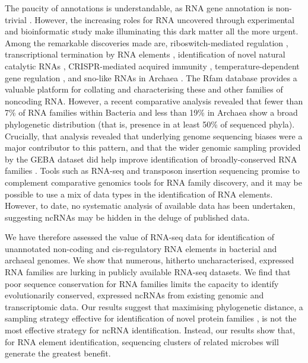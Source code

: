 \documentclass[10pt]{article}
\begin{document}
The paucity of annotations is understandable, as RNA gene annotation
is non-trivial \cite{Freyhult:2007,Nawrocki:2009}. However, the
increasing roles for RNA uncovered through experimental and
bioinformatic study make illuminating this dark matter all the more
urgent. Among the remarkable discoveries made are, riboswitch-mediated
regulation \cite{Barrick:2007}, transcriptional termination by RNA
elements \cite{Gardner:2011,Chen:2013,Cambray:2013}, identification of
novel natural catalytic RNAs \cite{Roth:2014}, CRISPR-mediated
acquired immunity \cite{Barrangou:2007}, temperature-dependent gene
regulation \cite{Loh:2013}, and sno-like RNAs in Archaea
\cite{Omer:2000,Gardner:2010}. The Rfam database
\cite{Gardner:2011,Burge:2013} provides a valuable platform for
collating and characterising these and other families of noncoding
RNA. However, a recent comparative analysis \cite{Hoeppner:2012}
revealed that fewer than 7\% of RNA families within Bacteria and less
than 19\% in Archaea show a broad phylogenetic distribution (that is,
presence in at least 50\% of sequenced phyla). Crucially, that
analysis revealed that underlying genome sequencing biases were a
major contributor to this pattern, and that the wider genomic sampling
provided by the GEBA dataset did help improve identification of
broadly-conserved RNA families \cite{Hoeppner:2012}. Tools such as
RNA-seq \cite{Croucher:2010} and transposon insertion
sequencing \cite{van_Opijnen:2013,Barquist:2013,Barquist:2013a}
promise to complement comparative genomics tools for RNA family
discovery, and it may be possible to use a mix of data types in the
identification of RNA elements. However, to date, no systematic
analysis of available data has been undertaken, suggesting ncRNAs may
be hidden in the deluge of published data.

We have therefore assessed the value of RNA-seq data for
identification of unannotated non-coding and cis-regulatory RNA
elements in bacterial and archaeal genomes. We show that numerous,
hitherto uncharacterised, expressed RNA families are lurking in
publicly available RNA-seq datasets. We find that poor sequence
conservation for RNA families limits the capacity to identify
evolutionarily conserved, expressed ncRNAs from existing genomic and
transcriptomic data. Our results suggest that maximising phylogenetic
distance, a sampling strategy effective for identification of novel
protein families \cite{Wu:2009,Rinke:2013}, is not the
most effective strategy for ncRNA identification. Instead, our results
show that, for RNA element identification, sequencing clusters of
related microbes will generate the greatest benefit.
\end{document}
